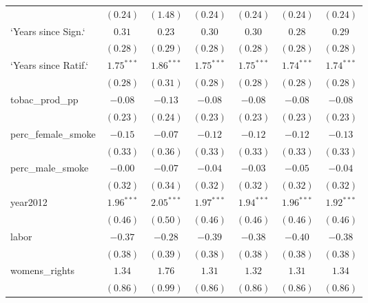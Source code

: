 \begin{table}[!h]
\begin{center}
\begin{tabular}{l c c c c c c }
                        & $(0.24)$     & $(1.48)$     & $(0.24)$     & $(0.24)$     & $(0.24)$     & $(0.24)$     \\
`Years since Sign.`     & $0.31$       & $0.23$       & $0.30$       & $0.30$       & $0.28$       & $0.29$       \\
                        & $(0.28)$     & $(0.29)$     & $(0.28)$     & $(0.28)$     & $(0.28)$     & $(0.28)$     \\
`Years since Ratif.`    & $1.75^{***}$ & $1.86^{***}$ & $1.75^{***}$ & $1.75^{***}$ & $1.74^{***}$ & $1.74^{***}$ \\
                        & $(0.28)$     & $(0.31)$     & $(0.28)$     & $(0.28)$     & $(0.28)$     & $(0.28)$     \\
tobac\_prod\_pp         & $-0.08$      & $-0.13$      & $-0.08$      & $-0.08$      & $-0.08$      & $-0.08$      \\
                        & $(0.23)$     & $(0.24)$     & $(0.23)$     & $(0.23)$     & $(0.23)$     & $(0.23)$     \\
perc\_female\_smoke     & $-0.15$      & $-0.07$      & $-0.12$      & $-0.12$      & $-0.12$      & $-0.13$      \\
                        & $(0.33)$     & $(0.36)$     & $(0.33)$     & $(0.33)$     & $(0.33)$     & $(0.33)$     \\
perc\_male\_smoke       & $-0.00$      & $-0.07$      & $-0.04$      & $-0.03$      & $-0.05$      & $-0.04$      \\
                        & $(0.32)$     & $(0.34)$     & $(0.32)$     & $(0.32)$     & $(0.32)$     & $(0.32)$     \\
year2012                & $1.96^{***}$ & $2.05^{***}$ & $1.97^{***}$ & $1.94^{***}$ & $1.96^{***}$ & $1.92^{***}$ \\
                        & $(0.46)$     & $(0.50)$     & $(0.46)$     & $(0.46)$     & $(0.46)$     & $(0.46)$     \\
labor                   & $-0.37$      & $-0.28$      & $-0.39$      & $-0.38$      & $-0.40$      & $-0.38$      \\
                        & $(0.38)$     & $(0.39)$     & $(0.38)$     & $(0.38)$     & $(0.38)$     & $(0.38)$     \\
womens\_rights          & $1.34$       & $1.76$       & $1.31$       & $1.32$       & $1.31$       & $1.34$       \\
                        & $(0.86)$     & $(0.99)$     & $(0.86)$     & $(0.86)$     & $(0.86)$     & $(0.86)$     \\

\end{tabular}
\end{center}
\end{table}
